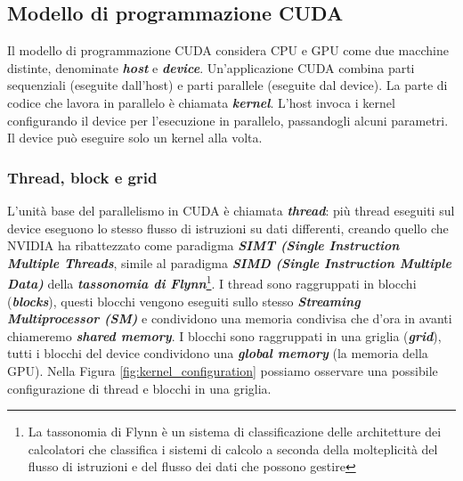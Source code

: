 \subsection{Modello di programmazione CUDA}
\noindent Il modello di programmazione CUDA considera CPU e GPU come due macchine distinte, denominate \textit{\textbf{host}} e \textit{\textbf{device}}. Un'applicazione CUDA combina parti sequenziali (eseguite dall'host) e parti parallele (eseguite dal device). La parte di codice che lavora in parallelo è chiamata \textit{\textbf{kernel}}. L'host invoca i kernel configurando il device per l'esecuzione in parallelo, passandogli alcuni parametri. Il device può eseguire solo un kernel alla volta.

\subsubsection{Thread, block e grid}
\noindent L'unità base del parallelismo in CUDA è chiamata \textit{\textbf{thread}}: più thread eseguiti sul device eseguono lo stesso flusso di istruzioni su dati differenti, creando quello che NVIDIA ha ribattezzato come paradigma \textit{\textbf{SIMT (Single Instruction Multiple Threads}}, simile al paradigma \textit{\textbf{SIMD (Single Instruction Multiple Data)}} della \textit{\textbf{tassonomia di Flynn}}\footnote{La tassonomia di Flynn è un sistema di classificazione delle architetture dei calcolatori che classifica i sistemi di calcolo a seconda della molteplicità del flusso di istruzioni e del flusso dei dati che possono gestire}.
I thread sono raggruppati in blocchi (\textit{\textbf{blocks}}), questi blocchi vengono eseguiti sullo stesso \textit{\textbf{Streaming Multiprocessor (SM)}} e condividono una memoria condivisa che d'ora in avanti chiameremo \textit{\textbf{shared memory}}.
I blocchi sono raggruppati in una griglia (\textit{\textbf{grid}}), tutti i blocchi del device condividono una \textit{\textbf{global memory}} (la memoria della GPU). Nella Figura \ref{fig:kernel_configuration} possiamo osservare una possibile configurazione di thread e blocchi in una griglia.
